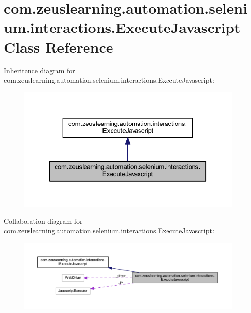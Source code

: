 \hypertarget{classcom_1_1zeuslearning_1_1automation_1_1selenium_1_1interactions_1_1ExecuteJavascript}{}\section{com.\+zeuslearning.\+automation.\+selenium.\+interactions.\+Execute\+Javascript Class Reference}
\label{classcom_1_1zeuslearning_1_1automation_1_1selenium_1_1interactions_1_1ExecuteJavascript}


Inheritance diagram for com.\+zeuslearning.\+automation.\+selenium.\+interactions.\+Execute\+Javascript\+:\nopagebreak
\begin{figure}[H]
\begin{center}
\leavevmode
\includegraphics[width=322pt]{d9/d09/classcom_1_1zeuslearning_1_1automation_1_1selenium_1_1interactions_1_1ExecuteJavascript__inherit__graph}
\end{center}
\end{figure}


Collaboration diagram for com.\+zeuslearning.\+automation.\+selenium.\+interactions.\+Execute\+Javascript\+:\nopagebreak
\begin{figure}[H]
\begin{center}
\leavevmode
\includegraphics[width=350pt]{d6/d72/classcom_1_1zeuslearning_1_1automation_1_1selenium_1_1interactions_1_1ExecuteJavascript__coll__graph}
\end{center}
\end{figure}

